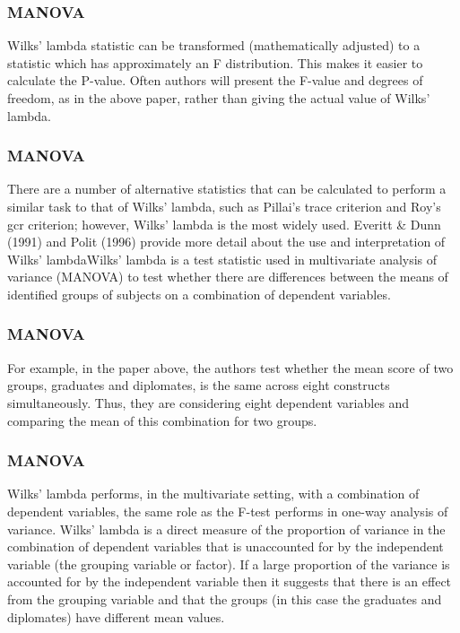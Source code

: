\documentclass{beamer}
\begin{document}
		\begin{frame}
			\frametitle{MANOVA}
			Wilks' lambda statistic can be transformed (mathematically adjusted) to a
			statistic which has approximately an F distribution. This makes it easier to
			calculate the P-value. Often authors will present the F-value and degrees of
			freedom, as in the above paper, rather than giving the actual value of Wilks'
			lambda.
		\end{frame}
		\begin{frame}
			\frametitle{MANOVA}
			There are a number of alternative statistics that can be calculated to
			perform a similar task to that of Wilks' lambda, such as Pillai's trace criterion
			and Roy's gcr criterion; however, Wilks' lambda is the most widely used.
			Everitt \& Dunn (1991) and Polit (1996) provide more detail about the use
			and interpretation of Wilks' lambdaWilks' lambda is a test statistic used in multivariate analysis of variance
			(MANOVA) to test whether there are differences between the means of
			identified groups of subjects on a combination of dependent variables. 
			
		\end{frame}
		\begin{frame}
			\frametitle{MANOVA}
			For
			example, in the paper above, the authors test whether the mean score of two
			groups, graduates and diplomates, is the same across eight constructs
			simultaneously. Thus, they are considering eight dependent variables and
			comparing the mean of this combination for two groups.
		\end{frame}
		\begin{frame}
			\frametitle{MANOVA}
			Wilks' lambda performs, in the multivariate setting, with a combination of
			dependent variables, the same role as the F-test performs in one-way analysis
			of variance. Wilks' lambda is a direct measure of the proportion of variance in
			the combination of dependent variables that is unaccounted for by the
			independent variable (the grouping variable or factor). If a large proportion
			of the variance is accounted for by the independent variable then it suggests
			that there is an effect from the grouping variable and that the groups (in this
			case the graduates and diplomates) have different mean values.
		\end{frame}
\end{document}
